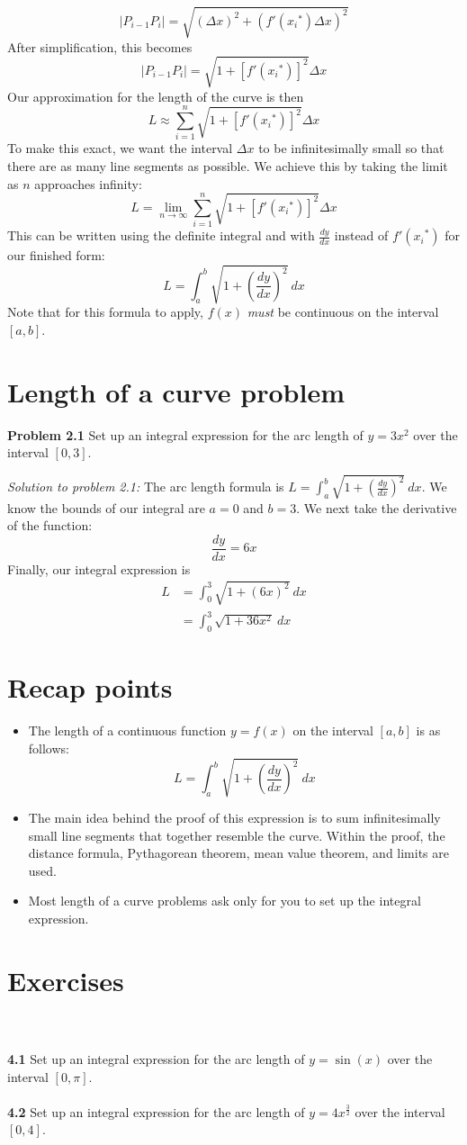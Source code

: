 \documentclass[11pt]{scrartcl}
\begin{document}
$$\lvert P_{i-1}P_i\rvert=\sqrt{(\Delta x)^2+(f'({x_i}^{\ast})\Delta x)^2}$$
After simplification, this becomes 
$$\lvert P_{i-1}P_i\rvert= \sqrt{1+[f'({x_i}^\ast)]^2}\Delta x$$
Our approximation for the length of the curve is then 
$$L \approx \sum_{i=1}^{n} \sqrt{1+[f'({x_i}^\ast)]^2}\Delta x$$
To make this exact, we want the interval $\Delta x$ to be infinitesimally small so that there are as many line segments as possible. We achieve this by taking the limit as $n$ approaches infinity: 
$$L=\lim_{n \to \infty} \sum_{i=1}^{n}  \sqrt{1+[f'({x_i}^\ast)]^2} \Delta x$$
This can be written using the definite integral and with $\frac{dy}{dx}$ instead of $f'({x_i}^\ast)$ for our finished form: 
$$L=\int_{a}^{b}\sqrt{1+\left(\frac{dy}{dx}\right)^2} \ dx$$
Note that for this formula to apply, $f(x)$ \textit{must} be continuous on the interval $[a,b]$. 
\section{Length of a curve problem}
\noindent 
\begin{tcolorbox}[colback=purple!5!white,colframe=purple!75!black]
\textbf{Problem 2.1} Set up an integral expression for the arc length of $y=3x^2$ over the interval $[0,3]$. 
\end{tcolorbox}
\noindent 
\textit{Solution to problem 2.1:}
The arc length formula is $L = \int_{a}^{b} {\sqrt{1+{\left(\frac{dy}{dx}\right)}^2}} \ dx$. We know the bounds of our integral are $a=0$ and $b=3$. We next take the derivative of the function: 
$$\frac{dy}{dx}=6x$$
\noindent 
Finally, our integral expression is 
\begin{align*}
L &=\int_0^3 \sqrt{1+(6x)^2} \ dx \\
  &=\int_0^3 \sqrt{1+36x^2} \ dx
\end{align*}
\section{Recap points}
\begin{itemize}
    \item The length of a continuous function $y=f(x)$ on the interval $[a,b]$ is as follows: 
    $$L=\int_{a}^{b}\sqrt{1+\left(\frac{dy}{dx}\right)^2} \ dx$$
    \item The main idea behind the proof of this expression is to sum infinitesimally small line segments that together resemble the curve. Within the proof, the distance formula, Pythagorean theorem, mean value theorem, and limits are used. 
    \item Most length of a curve problems ask only for you to set up the integral expression. 
\end{itemize}
\section{Exercises}\\
\\
\noindent 
\textbf{4.1} Set up an integral expression for the arc length of $y=\sin(x)$ over the interval $[0,\pi]$.\\
\\
\noindent 
\textbf{4.2} Set up an integral expression for the arc length of $y=4x^{\frac{3}{2}}$ over the interval $[0,4]$. 
\end{document}
